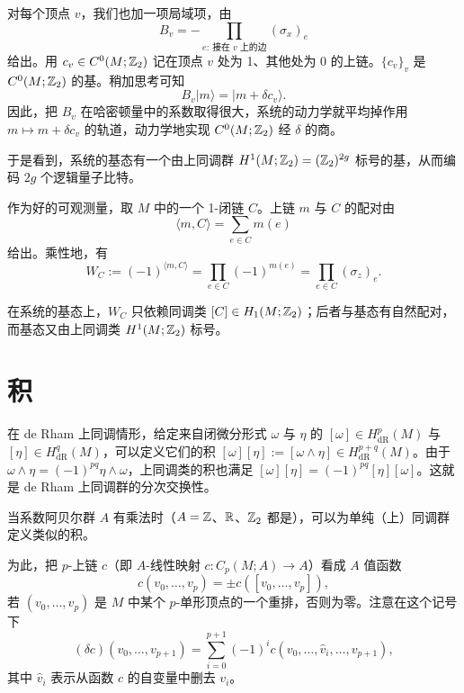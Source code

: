 对每个顶点 $v$，我们也加一项局域项，由
\begin{equation}
  B_v=-\prod_{e:\ \text{接在 $v$ 上的边}}(\sigma_x)_e
  \tag{6.28}
\end{equation}
给出。用 $c_v\in C^0(M;\mathbb{Z}_2)$ 记在顶点 $v$ 处为 1、其他处为 0 的上链。$\{c_v\}_v$ 是 $C^0(M;\mathbb{Z}_2)$ 的基。稍加思考可知
\begin{equation}
  B_v|m\rangle=|m+\delta c_v\rangle.
  \tag{6.29}
\end{equation}
因此，把 $B_v$ 在哈密顿量中的系数取得很大，系统的动力学就平均掉作用 $m\mapsto m+\delta c_v$ 的轨道，动力学地实现 $C^0(M;\mathbb{Z}_2)$ 经 $\delta$ 的商。

于是看到，系统的基态有一个由上同调群 $H^1(M;\mathbb{Z}_2)=(\mathbb{Z}_2)^{2g}$ 标号的基，从而编码 $2g$ 个逻辑量子比特。

作为好的可观测量，取 $M$ 中的一个 1-闭链 $C$。上链 $m$ 与 $C$ 的配对由
\begin{equation}
  \langle m,C\rangle=\sum_{e\in C}m(e)
  \tag{6.30}
\end{equation}
给出。乘性地，有
\begin{equation}
  W_C:=(-1)^{\langle m,C\rangle}=\prod_{e\in C}(-1)^{m(e)}=\prod_{e\in C}(\sigma_z)_e.
  \tag{6.31}
\end{equation}

在系统的基态上，$W_C$ 只依赖同调类 $[C]\in H_1(M;\mathbb{Z}_2)$；后者与基态有自然配对，而基态又由上同调类 $H^1(M;\mathbb{Z}_2)$ 标号。


\section{积}

在 de Rham 上同调情形，给定来自闭微分形式 $\omega$ 与 $\eta$ 的 $[\omega]\in H^p_{\mathrm{dR}}(M)$ 与 $[\eta]\in H^q_{\mathrm{dR}}(M)$，可以定义它们的积 $[\omega][\eta]:=[\omega\wedge\eta]\in H^{p+q}_{\mathrm{dR}}(M)$。由于 $\omega\wedge\eta=(-1)^{pq}\eta\wedge\omega$，上同调类的积也满足 $[\omega][\eta]=(-1)^{pq}[\eta][\omega]$。这就是 de Rham 上同调群的分次交换性。

当系数阿贝尔群 $A$ 有乘法时（$A=\mathbb{Z}$、$\mathbb{R}$、$\mathbb{Z}_2$ 都是），可以为单纯（上）同调群定义类似的积。

为此，把 $p$-上链 $c$（即 $A$-线性映射 $c:C_p(M;A)\to A$）看成 $A$ 值函数
\begin{equation}
  c(v_0,\dots,v_p)=\pm c([v_0,\dots,v_p]),
  \tag{6.32}
\end{equation}
若 $(v_0,\dots,v_p)$ 是 $M$ 中某个 $p$-单形顶点的一个重排，否则为零。注意在这个记号下
\begin{equation}
  (\delta c)(v_0,\dots,v_{p+1})=\sum_{i=0}^{p+1}(-1)^ic(v_0,\dots,\hat v_i,\dots,v_{p+1}),
  \tag{6.33}
\end{equation}
其中 $\hat v_i$ 表示从函数 $c$ 的自变量中删去 $v_i$。

